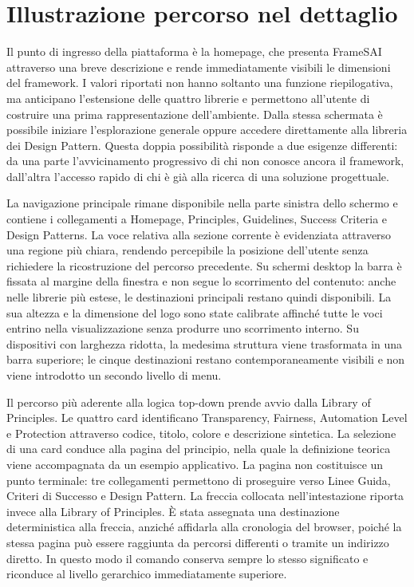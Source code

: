 \section{Illustrazione percorso nel dettaglio}

Il punto di ingresso della piattaforma è la homepage, che presenta FrameSAI attraverso una breve descrizione e rende immediatamente visibili le dimensioni del framework. I valori riportati non hanno soltanto una funzione riepilogativa, ma anticipano l'estensione delle quattro librerie e permettono all'utente di costruire una prima rappresentazione dell'ambiente. Dalla stessa schermata è possibile iniziare l'esplorazione generale oppure accedere direttamente alla libreria dei Design Pattern. Questa doppia possibilità risponde a due esigenze differenti: da una parte l'avvicinamento progressivo di chi non conosce ancora il framework, dall'altra l'accesso rapido di chi è già alla ricerca di una soluzione progettuale.

La navigazione principale rimane disponibile nella parte sinistra dello schermo e contiene i collegamenti a Homepage, Principles, Guidelines, Success Criteria e Design Patterns. La voce relativa alla sezione corrente è evidenziata attraverso una regione più chiara, rendendo percepibile la posizione dell'utente senza richiedere la ricostruzione del percorso precedente. Su schermi desktop la barra è fissata al margine della finestra e non segue lo scorrimento del contenuto: anche nelle librerie più estese, le destinazioni principali restano quindi disponibili. La sua altezza e la dimensione del logo sono state calibrate affinché tutte le voci entrino nella visualizzazione senza produrre uno scorrimento interno. Su dispositivi con larghezza ridotta, la medesima struttura viene trasformata in una barra superiore; le cinque destinazioni restano contemporaneamente visibili e non viene introdotto un secondo livello di menu.

Il percorso più aderente alla logica top-down prende avvio dalla Library of Principles. Le quattro card identificano Transparency, Fairness, Automation Level e Protection attraverso codice, titolo, colore e descrizione sintetica. La selezione di una card conduce alla pagina del principio, nella quale la definizione teorica viene accompagnata da un esempio applicativo. La pagina non costituisce un punto terminale: tre collegamenti permettono di proseguire verso Linee Guida, Criteri di Successo e Design Pattern. La freccia collocata nell'intestazione riporta invece alla Library of Principles. È stata assegnata una destinazione deterministica alla freccia, anziché affidarla alla cronologia del browser, poiché la stessa pagina può essere raggiunta da percorsi differenti o tramite un indirizzo diretto. In questo modo il comando conserva sempre lo stesso significato e riconduce al livello gerarchico immediatamente superiore.


